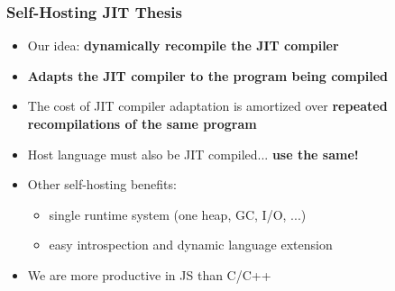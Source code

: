 \begin{frame}
\frametitle{\bf Self-Hosting JIT Thesis}

  \begin{itemize}

  \item Our idea: {\bf dynamically recompile the JIT compiler}
    \bigskip
    \bigskip

  \item {\bf Adapts the JIT compiler to the program being compiled}
    \smallskip

  \item The cost of JIT compiler adaptation is amortized over
    {\bf repeated recompilations of the same program}
    \smallskip

  \item Host language must also be JIT compiled... {\bf use the same!}
    \bigskip

  \item Other self-hosting benefits:
    \begin{itemize}
      \item single runtime system (one heap, GC, I/O, ...)
      \item easy introspection and dynamic language extension
    \end{itemize}
    \smallskip

  \item We are more productive in JS than C/C++

  \end{itemize}
\end{frame}

